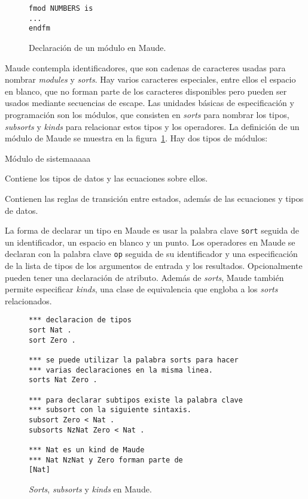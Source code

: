 \documentclass[11pt,captions=nooneline,DIV=14, parskip=full]{scrartcl}
\begin{document}
\begin{figure}[!htbp]
\begin{lstlisting}[frame=single]
fmod NUMBERS is
...
endfm
\end{lstlisting} 
\caption{Declaración de un módulo en Maude.}
\label{fig:maudemods}
\end{figure}

Maude contempla identificadores, que son cadenas de caracteres usadas para nombrar \textit{modules} y \textit{sorts}. Hay varios caracteres especiales, entre ellos el espacio en blanco, que no forman parte de los caracteres disponibles pero pueden ser usados mediante secuencias de escape. Las unidades básicas de especificación y programación son los módulos, que consisten en \textit{sorts} para nombrar los tipos, \textit{subsorts} y \textit{kinds} para relacionar estos tipos y los operadores. La definición de un módulo de Maude se muestra en la figura~\ref{fig:maudemods}. Hay dos tipos de módulos:

\begin{labeling}{Módulo de sistemaaaaa}
\item [\textbf{Módulo funcional}] Contiene los tipos de datos y las ecuaciones sobre ellos.
\item [\textbf{Módulo de sistema}] Contienen las reglas de transición entre estados, además de las ecuaciones y tipos de datos.
\end{labeling}

La forma de declarar un tipo en Maude es usar la palabra clave \texttt{sort} seguida de un identificador, un espacio en blanco y un punto. Los operadores en Maude se declaran con la palabra clave \texttt{op} seguida de su identificador y una especificación de la lista de tipos de los argumentos de entrada y los resultados. Opcionalmente pueden tener una declaración de atributo. 
Además de \textit{sorts}, Maude también permite especificar \textit{kinds}, una clase de equivalencia que engloba a los \textit{sorts} relacionados.

\begin{figure}[!htbp]
\begin{lstlisting}[frame=single]
*** declaracion de tipos
sort Nat .
sort Zero .

*** se puede utilizar la palabra sorts para hacer
*** varias declaraciones en la misma linea.
sorts Nat Zero .

*** para declarar subtipos existe la palabra clave
*** subsort con la siguiente sintaxis.
subsort Zero < Nat .
subsorts NzNat Zero < Nat .

*** Nat es un kind de Maude
*** Nat NzNat y Zero forman parte de
[Nat]
\end{lstlisting} 
\caption{\textit{Sorts}, \textit{subsorts} y \textit{kinds} en Maude.}
\label{fig:maudesyntax}
\end{figure}
\end{document}
